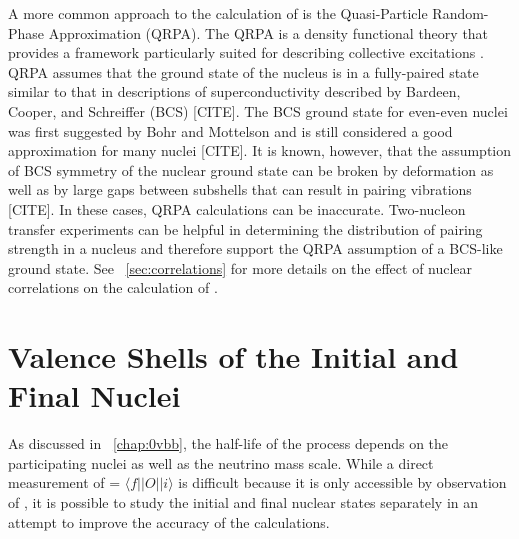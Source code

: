 A more common approach to the calculation of \NME is the Quasi-Particle Random-Phase Approximation (QRPA).  The QRPA is a density functional theory that provides a framework particularly suited for describing collective excitations \citep{Casten}.  QRPA assumes that the ground state of the nucleus is in a fully-paired state \citep{BenderSCMF} similar to that in descriptions of superconductivity described by Bardeen, Cooper, and Schreiffer (BCS) [CITE].  The BCS ground state for even-even nuclei was first suggested by Bohr and Mottelson \citep{nucleiBCS} and is still considered a good approximation for many nuclei [CITE].  It is known, however, that the assumption of BCS symmetry of the nuclear ground state can be broken by deformation as well as by large gaps between subshells that can result in pairing vibrations [CITE].  In these cases, QRPA calculations can be inaccurate.  Two-nucleon transfer experiments can be helpful in determining the distribution of pairing strength in a nucleus \citep{Yoshida} and therefore support the QRPA assumption of a BCS-like ground state.  See {\sect}~\ref{sec:correlations} for more details on the effect of nuclear correlations on the calculation of \NME. 

\section{Valence Shells of the Initial and Final Nuclei}
\label{sec:valence}

As discussed in {\chap}~\ref{chap:0vbb}, the half-life of the \zvbb process depends on the participating nuclei as well as the neutrino mass scale.  While a direct measurement of \NME = $\langle f||O||i \rangle$ is difficult because it is only accessible by observation of \zvbb, it is possible to study the initial and final nuclear states separately in an attempt to improve the accuracy of the calculations.  


